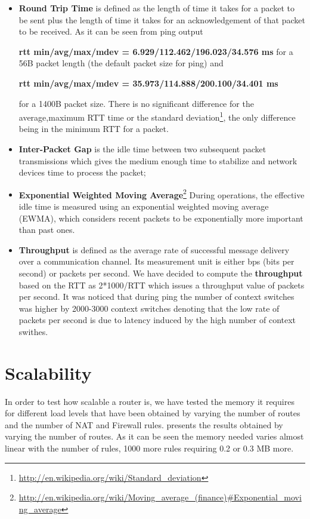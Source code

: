 \begin{itemize}
\item \textbf{Round Trip Time} is defined as the length of time it takes for a packet to be sent plus the length of time it takes for an acknowledgement of that packet to be received.
As it can be seen from ping output 

\textbf{rtt min/avg/max/mdev = 6.929/112.462/196.023/34.576 ms}
for a 56B packet length (the default packet size for ping) and 

\textbf{rtt min/avg/max/mdev = 35.973/114.888/200.100/34.401 ms}

for a 1400B packet size. There is no significant difference for the average,maximum RTT time or the standard deviation\footnote{\url{http://en.wikipedia.org/wiki/Standard_deviation}}, the only difference being in the minimum RTT for a packet.  
\item \textbf{Inter-Packet Gap} is the idle time between two subsequent packet transmissions which gives the medium enough time to stabilize and network devices time to process the packet;

\item \textbf{Exponential Weighted Moving Average}\footnote{\url{http://en.wikipedia.org/wiki/Moving_average_(finance)#Exponential_moving_average}} 
During operations, the effective idle time is measured using an exponential weighted moving average (EWMA), which considers 
recent packets to be exponentially more important than past ones. 

\item \textbf{Throughput} is defined as the average rate of successful message delivery over a 
communication channel. Its measurement unit is either bps (bits per second) or packets per second.
We have decided to compute the \textbf{throughput} based on the RTT as 2*1000/RTT which issues a throughput 
value of  packets per second. It was noticed that during ping the number of context switches 
was higher by 2000-3000 context switches denoting that the low rate of packets per second is due to 
latency induced by the high number of context swithes. 
\end{itemize}
\section{Scalability}
\label{sec:scalability}

In order to test how scalable a router is, we have tested the memory it requires for different load levels that have been obtained 
by varying the number of routes and the number of NAT and Firewall rules.
 presents the results obtained by varying the number of routes.
As it can be seen the memory needed varies almost linear with the number of rules, 1000 more rules requiring 0.2 or 0.3 MB more.

